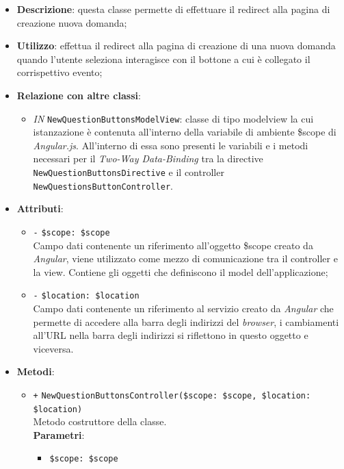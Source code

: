 \begin{itemize}
	\item \textbf{Descrizione}: questa classe permette di effettuare il redirect alla pagina di creazione nuova domanda;
	\item \textbf{Utilizzo}: effettua il redirect alla pagina di creazione di una nuova domanda quando l'utente seleziona interagisce con il bottone a cui è collegato il corrispettivo evento;
	\item \textbf{Relazione con altre classi}:
	\begin{itemize}
		\item \textit{IN} \texttt{NewQuestionButtonsModelView}: classe di tipo modelview la cui istanzazione è contenuta all'interno della variabile di ambiente \$scope di \textit{Angular.js}. All'interno di essa sono presenti le variabili e i metodi necessari per il \textit{Two-Way Data-Binding} tra la directive \texttt{NewQuestionButtonsDirective} e il controller \texttt{NewQuestionsButtonController}.
	\end{itemize}
	\item \textbf{Attributi}:
	\begin{itemize}
		\item \texttt{-} \texttt{\$scope: \$scope} \\
		Campo dati contenente un riferimento all’oggetto \$scope creato da \textit{Angular}, viene utilizzato come mezzo di comunicazione tra il controller e la view. Contiene gli oggetti che definiscono il model dell’applicazione;
		\item \texttt{-} \texttt{\$location: \$location} \\
		Campo dati contenente un riferimento al servizio creato da \textit{Angular} che permette di accedere alla barra degli indirizzi del \textit{browser}, i cambiamenti all’URL nella barra degli indirizzi si riflettono in questo oggetto e viceversa.
	\end{itemize}
	\item \textbf{Metodi}:
	\begin{itemize}
		\item \texttt{+} \texttt{NewQuestionButtonsController(\$scope: \$scope, \$location: \$location)} \\ 
		Metodo costruttore della classe. \\
		\textbf{Parametri}:
		\begin{itemize}
			\item \texttt{\$scope: \$scope} \\

\end{itemize}
\end{itemize}
\end{itemize}
